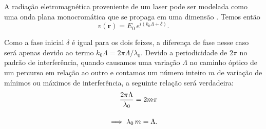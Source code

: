 \noindent A radiação eletromagnética proveniente de um laser pode ser modelada como uma onda plana monocromática que se propaga em uma dimensão .
Temos então
\begin{equation}
	v(\mathbf{r}) = E_0 \, e^{i(k_0 \Lambda + \delta)}.
\end{equation}

\noindent Como a fase inicial $\delta$ é igual para os dois feixes, a diferença de fase nesse caso será apenas devido ao termo $k_0 \Lambda = 2\pi \Lambda / \lambda_0$. 
Devido a periodicidade de $2\pi$ no padrão de interferência, quando causamos uma variação $\Lambda$ no caminho óptico de um percurso em relação ao outro e contamos um número inteiro $m$ de variação de mínimos ou máximos de interferência, a seguinte relação será verdadeira:
\begin{align}\label{eq: lambda(LAMBDA)}
\frac{2\pi \Lambda}{\lambda_0} = 2m\pi \notag \\[1em]
\implies \lambda_0 \, m = \Lambda.
\end{align}


